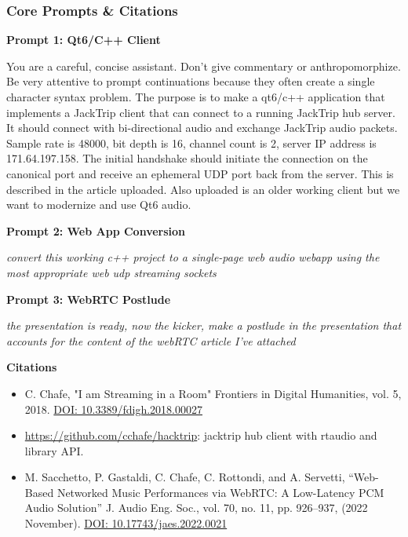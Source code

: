 \documentclass{beamer}
\begin{document}
\begin{frame}[fragile]
  \frametitle{Core Prompts \& Citations}
  \scriptsize %

  {\tiny\textbf{Prompt 1: Qt6/C++ Client}}
  \par
  You are a careful, concise assistant. Don't give commentary or anthropomorphize. Be very attentive to prompt continuations because they often create a single character syntax problem. The purpose is to make a qt6/c++ application that implements a JackTrip client that can connect to a running JackTrip hub server. It should connect with bi-directional audio and exchange JackTrip audio packets. Sample rate is 48000, bit depth is 16, channel count is 2, server IP address is 171.64.197.158. The initial handshake should initiate the connection on the canonical port and receive an ephemeral UDP port back from the server. This is described in the article uploaded. Also uploaded is an older working client but we want to modernize and use Qt6 audio.
  
  \par{\tiny\textbf{Prompt 2: Web App Conversion}}\par
  \textit{convert this working c++ project to a single-page web audio webapp using the most appropriate web udp streaming sockets}
  
  \par{\tiny\textbf{Prompt 3: WebRTC Postlude}}\par
  \textit{the presentation is ready, now the kicker, make a postlude in the presentation that accounts for the content of the webRTC article I've attached}
  
  \par{\tiny\textbf{Citations}}
  \setlength{\itemsep}{0pt} %
  \begin{itemize}
      \item C. Chafe, "I am Streaming in a Room" Frontiers in Digital Humanities, vol. 5, 2018. \href{https://doi.org/10.3389/fdigh.2018.00027}{DOI: 10.3389/fdigh.2018.00027}
      
      \item \url{https://github.com/cchafe/hacktrip}: jacktrip hub client with rtaudio and library API.
      
      \item M. Sacchetto, P. Gastaldi, C. Chafe, C. Rottondi, and A. Servetti, “Web-Based Networked Music Performances via WebRTC: A Low-Latency PCM Audio Solution” J. Audio Eng. Soc., vol. 70, no. 11, pp. 926–937, (2022 November). \href{https://doi.org/10.17743/jaes.2022.0021}{DOI: 10.17743/jaes.2022.0021}
  \end{itemize}
\end{frame}
\end{document}
